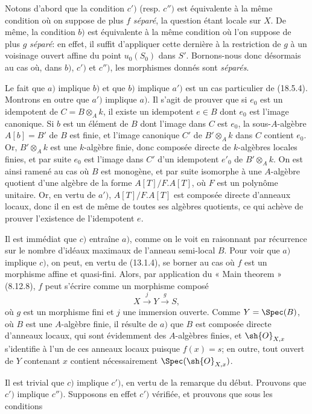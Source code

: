 Notons d'abord que la condition $c')$ (resp. $c'')$ est équivalente à la même condition où on suppose de plus $f$ \emph{séparé}, la question étant locale sur $X$. De même, la condition $b)$ est équivalente à la même condition où l'on suppose de plus $g$ \emph{séparé}: en effet, il suffit d'appliquer cette dernière à la restriction de $g$ à un voisinage ouvert affine du point $u_0(S_0)$ dans $S'$. Bornons-nous donc désormais au cas où, dans $b)$, $c')$ et $c'')$, les morphismes donnés sont \emph{séparés}.

Le fait que $a)$ implique $b)$ et que $b)$ implique $a')$ est un cas particulier de (18.5.4). Montrons en outre que $a')$ implique $a)$. Il s'agit de prouver que si $e_0$ est un idempotent de $C=B\otimes_A k$, il existe un idempotent $e\in B$ dont $e_0$ est l'image canonique. Si $b$ est un élément de $B$ dont l'image dans $C$ est $e_0$, la sous-$A$-algèbre $A[b]=B'$ de $B$ est finie, et l'image canonique $C'$ de $B'\otimes_A k$ dans $C$ contient $e_0$. Or, $B'\otimes_A k$ est une $k$-algèbre finie, donc composée directe de $k$-algèbres locales finies, et par suite $e_0$ est l'image dans $C'$ d'un idempotent $e'_0$ de $B'\otimes_A k$. On est ainsi ramené au cas où $B$ est monogène, et par suite isomorphe à une $A$-algèbre quotient d'une algèbre de la forme $A[T]/F.A[T]$, où $F$ est un polynôme unitaire. Or, en vertu de $a')$, $A[T]/F.A[T]$ est composée directe d'anneaux locaux, donc il en est de même de toutes ses algèbres quotients, ce qui achève de prouver l'existence de l'idempotent $e$.

Il est immédiat que $c)$ entraîne $a)$, comme on le voit en raisonnant par récurrence sur le nombre d'idéaux maximaux de l'anneau semi-local $B$. Pour voir que $a)$ implique $c)$, on peut, en vertu de (13.1.4), se borner au cas où $f$ est un morphisme affine et quasi-fini. Alors, par application du « Main theorem » (8.12.8), $f$ peut s'écrire comme un morphisme composé
\[
  X\xrightarrow{j}Y\xrightarrow{g}S,
\]
où $g$ est un morphisme fini et $j$ une immersion ouverte. Comme $Y=\Spec(B)$, où $B$ est une $A$-algèbre finie, il résulte de $a)$ que $B$ est composée directe d'anneaux locaux, qui sont évidemment des $A$-algèbres finies, et $\sh{O}_{X,x}$ s'identifie à l'un de ces anneaux locaux puisque $f(x)=s$; en outre, tout ouvert de $Y$ contenant $x$ contient nécessairement $\Spec(\sh{O}_{X,x})$.

Il est trivial que $c)$ implique $c')$, en vertu de la remarque du début. Prouvons que $c')$ implique $c'')$. Supposons en effet $c')$ vérifiée, et prouvons que sous les conditions


